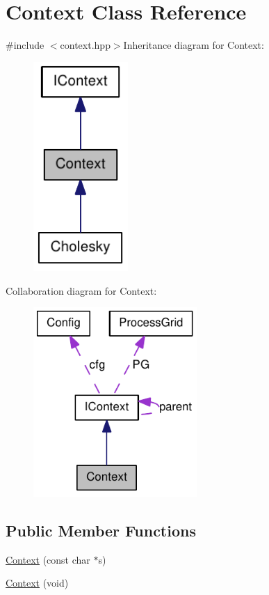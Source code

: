 \hypertarget{class_context}{
\section{Context Class Reference}
\label{class_context}
}


{\ttfamily \#include $<$context.hpp$>$}Inheritance diagram for Context:\nopagebreak
\begin{figure}[H]
\begin{center}
\leavevmode
\includegraphics[width=102pt]{class_context__inherit__graph}
\end{center}
\end{figure}
Collaboration diagram for Context:\nopagebreak
\begin{figure}[H]
\begin{center}
\leavevmode
\includegraphics[width=176pt]{class_context__coll__graph}
\end{center}
\end{figure}
\subsection*{Public Member Functions}
\begin{DoxyCompactItemize}
\item 
\hyperlink{class_context_a33e268526c03979a4db8bdabcce2fbf6}{Context} (const char $\ast$s)
\item 
\hyperlink{class_context_a5dd483a8c3183056682ebaa945acdc6d}{Context} (void)
\end{DoxyCompactItemize}


